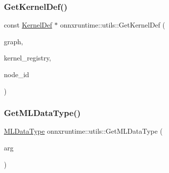 \subsubsection{\texorpdfstring{Get\+Kernel\+Def()}{GetKernelDef()}\hspace{0.1cm}{\footnotesize\ttfamily [2/2]}}
{\footnotesize\ttfamily const \mbox{\hyperlink{classonnxruntime_1_1KernelDef}{Kernel\+Def}} $\ast$ onnxruntime\+::utils\+::\+Get\+Kernel\+Def (\begin{DoxyParamCaption}\item[{const \mbox{\hyperlink{classonnxruntime_1_1Graph}{onnxruntime\+::\+Graph}} \&}]{graph,  }\item[{const \mbox{\hyperlink{classonnxruntime_1_1KernelRegistryManager}{Kernel\+Registry\+Manager}} \&}]{kernel\+\_\+registry,  }\item[{const \mbox{\hyperlink{namespaceonnxruntime_af8773b5c12b5d8fd9292eb2e268df760}{onnxruntime\+::\+Node\+Index}}}]{node\+\_\+id }\end{DoxyParamCaption})}

\mbox{\label{namespaceonnxruntime_1_1utils_ab22ac0ad2ec6d6529d6bacc19f7d7093}} 
\subsubsection{\texorpdfstring{Get\+M\+L\+Data\+Type()}{GetMLDataType()}}
{\footnotesize\ttfamily \mbox{\hyperlink{namespaceonnxruntime_ad77d0a6e838ec7da5dc35fed5ee66b49}{M\+L\+Data\+Type}} onnxruntime\+::utils\+::\+Get\+M\+L\+Data\+Type (\begin{DoxyParamCaption}\item[{const \mbox{\hyperlink{classonnxruntime_1_1NodeArg}{onnxruntime\+::\+Node\+Arg}} \&}]{arg }\end{DoxyParamCaption})}

\mbox{\label{namespaceonnxruntime_1_1utils_a2d84b5cf8a44b5c9ac8acdc0fd605544}} 
